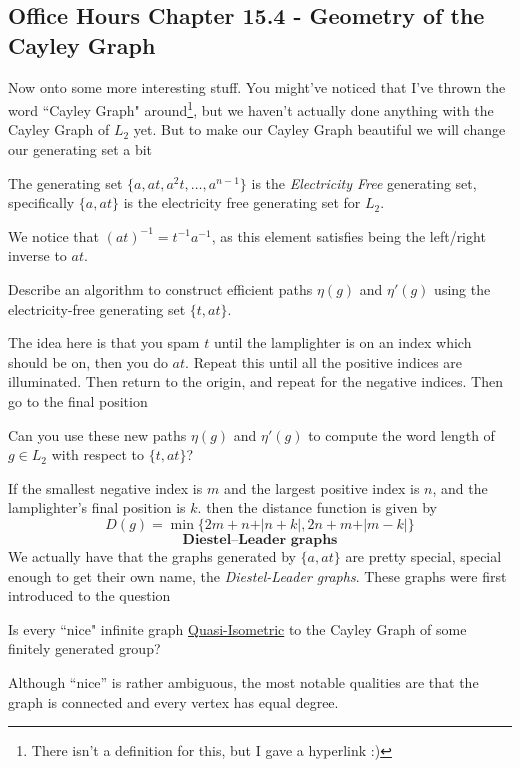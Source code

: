 \subsection{Office Hours Chapter 15.4 - Geometry of the Cayley Graph}
Now onto some more interesting stuff. You might've noticed that I've thrown the word ``Cayley Graph" around\footnote{There isn't a definition for this, but I gave a hyperlink :)}, but we haven't actually done anything with the Cayley Graph of $L_2$ yet. But to make our Cayley Graph beautiful we will change our generating set a bit
\begin{definition}
    The generating set $\{a,at,a^2t,\ldots,a^{n-1}\}$ is the \textit{Electricity Free} generating set, specifically $\{a,at\}$ is the electricity free generating set for $L_2$.
\end{definition}
We notice that $(at)^{-1} = t^{-1}a^{-1}$, as this element satisfies being the left/right inverse to $at$.
\newpage
\begin{exercise}
    Describe an algorithm to construct efficient paths $\eta(g)$ and $\eta'(g)$ using the electricity-free generating set $\{t, at\}$.
\end{exercise}
The idea here is that you spam $t$ until the lamplighter is on an index which should be on, then you do $at$. Repeat this until all the positive indices are illuminated. Then return to the origin, and repeat for the negative indices. Then go to the final position
\begin{exercise}
    Can you use these new paths $\eta(g)$ and $\eta'(g)$ to compute the word length of $g\in L_2$ with respect to $\{t,at\}$?
\end{exercise}
If the smallest negative index is $m$ and the largest positive index is $n$, and the lamplighter's final position is $k$. then the distance function is given by
\[ D(g) = \min\{ 2m+n+\vert n+k\vert ,2n+m+\vert m-k\vert \}\]
\[\textbf{Diestel–Leader graphs}\]
We actually have that the graphs generated by $\{a,at\}$ are pretty special, special enough to get their own name, the \textit{Diestel-Leader graphs}. These graphs were first introduced to the question
\begin{center}
    Is every ``nice" infinite graph \href{https://en.wikipedia.org/wiki/Quasi-isometry}{Quasi-Isometric} to the Cayley Graph of some finitely generated group?
\end{center}
Although ``nice'' is rather ambiguous, the most notable qualities are that the graph is connected and every vertex has equal degree.
